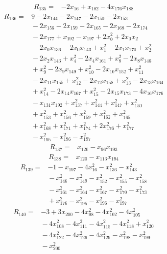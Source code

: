 \documentclass[11pt]{article}
\theoremstyle{definition}
\theoremstyle{remark}
\begin{document}
\begin{align*}
R_{135} ={}& -2x_{16} + x_{182} - 4x_{176} x_{188}
\end{align*}
\begin{align*}
R_{136} ={}& 9 - 2x_{144} - 2x_{147} - 2x_{150} - 2x_{153} \\
&{} -2x_{156} - 2x_{159} - 2x_{165} - 2x_{168} - 2x_{174} \\
&{} -2x_{177} + x_{192} - x_{197} + 2x_{0}^{2} + 2x_{0} x_{2} \\
&{} -2x_{0} x_{136} - 2x_{0} x_{143} + x_{1}^{2} - 2x_{1} x_{170} + x_{2}^{2} \\
&{} -2x_{2} x_{143} + x_{4}^{2} - 2x_{4} x_{161} + x_{8}^{2} - 2x_{8} x_{146} \\
&{} + x_{9}^{2} - 2x_{9} x_{149} + x_{10}^{2} - 2x_{10} x_{152} + x_{11}^{2} \\
&{} -2x_{11} x_{155} + x_{12}^{2} - 2x_{12} x_{158} + x_{13}^{2} - 2x_{13} x_{164} \\
&{} + x_{14}^{2} - 2x_{14} x_{167} + x_{15}^{2} - 2x_{15} x_{173} - 4x_{16} x_{176} \\
&{} -x_{131} x_{192} + x_{137}^{2} + x_{144}^{2} + x_{147}^{2} + x_{150}^{2} \\
&{} + x_{153}^{2} + x_{156}^{2} + x_{159}^{2} + x_{162}^{2} + x_{165}^{2} \\
&{} + x_{168}^{2} + x_{171}^{2} + x_{174}^{2} + 2x_{176}^{2} + x_{177}^{2} \\
&{} -x_{195}^{2} - x_{196}^{2} - x_{197}^{2}
\end{align*}
\begin{align*}
R_{137} ={}& x_{120} - x_{96} x_{193}
\end{align*}
\begin{align*}
R_{138} ={}& x_{120} - x_{113} x_{194}
\end{align*}
\begin{align*}
R_{139} ={}& -1 - x_{197} - 4x_{16}^{2} - x_{136}^{2} - x_{143}^{2} \\
&{} -x_{146}^{2} - x_{149}^{2} - x_{152}^{2} - x_{155}^{2} - x_{158}^{2} \\
&{} -x_{161}^{2} - x_{164}^{2} - x_{167}^{2} - x_{170}^{2} - x_{173}^{2} \\
&{} + x_{176}^{2} - x_{195}^{2} - x_{196}^{2} - x_{197}^{2}
\end{align*}
\begin{align*}
R_{140} ={}& -3 + 3x_{200} - 4x_{98}^{2} - 4x_{102}^{2} - 4x_{105}^{2} \\
&{} -4x_{108}^{2} - 4x_{111}^{2} - 4x_{115}^{2} - 4x_{118}^{2} + x_{120}^{2} \\
&{} -4x_{122}^{2} - 4x_{126}^{2} - 4x_{129}^{2} - x_{198}^{2} - x_{199}^{2} \\
&{} -x_{200}^{2}
\end{align*}
\end{document}
